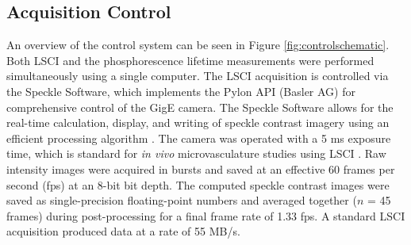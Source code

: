 \begin{table}
    \caption{Summary of optical filters in the imaging system}
    \label{tab:filters}
    \centering
\end{table}

\subsection{Acquisition Control} \label{ssec:acquisition_control}

An overview of the control system can be seen in Figure \ref{fig:controlschematic}. Both LSCI and the phosphorescence lifetime measurements were performed simultaneously using a single computer. The LSCI acquisition is controlled via the Speckle Software, which implements the Pylon API (Basler AG) for comprehensive control of the GigE camera. The Speckle Software allows for the real-time calculation, display, and writing of speckle contrast imagery using an efficient processing algorithm \cite{Tom:2008tg}. The camera was operated with a 5 ms exposure time, which is standard for \textit{in vivo} microvasculature studies using LSCI \cite{Yuan:2005tj}. Raw intensity images were acquired in bursts and saved at an effective 60 frames per second (fps) at an 8-bit bit depth. The computed speckle contrast images were saved as single-precision floating-point numbers and averaged together ($n$ = 45 frames) during post-processing for a final frame rate of 1.33 fps. A standard LSCI acquisition produced data at a rate of 55 MB/s.

